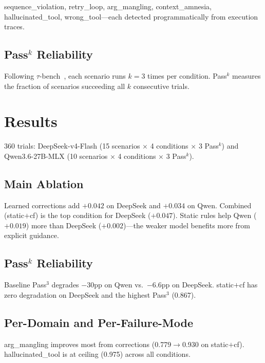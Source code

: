 \documentclass[11pt]{article}
\begin{document}
sequence\_violation, retry\_loop, arg\_mangling, context\_amnesia,
hallucinated\_tool, wrong\_tool---each detected programmatically from
execution traces.

\subsection{Pass$^k$ Reliability}

Following $\tau$-bench~\cite{taubench}, each scenario runs $k=3$ times per
condition. Pass$^k$ measures the fraction of scenarios succeeding all $k$
consecutive trials.

\section{Results}

360 trials: DeepSeek-v4-Flash (15 scenarios $\times$ 4 conditions $\times$
3 Pass$^k$) and Qwen3.6-27B-MLX (10 scenarios $\times$ 4 conditions $\times$
3 Pass$^k$).

\subsection{Main Ablation}



Learned corrections add $+0.042$ on DeepSeek and $+0.034$ on Qwen. Combined
(static$+$cf) is the top condition for DeepSeek ($+0.047$). Static rules help
Qwen ($+0.019$) more than DeepSeek ($+0.002$)---the weaker model benefits more
from explicit guidance.

\subsection{Pass$^k$ Reliability}



Baseline Pass$^3$ degrades $-30$pp on Qwen vs.\ $-6.6$pp on DeepSeek.
static$+$cf has zero degradation on DeepSeek and the highest Pass$^3$ (0.867).

\subsection{Per-Domain and Per-Failure-Mode}





arg\_mangling improves most from corrections (0.779$\rightarrow$0.930 on
static$+$cf). hallucinated\_tool is at ceiling (0.975) across all conditions.
\end{document}
